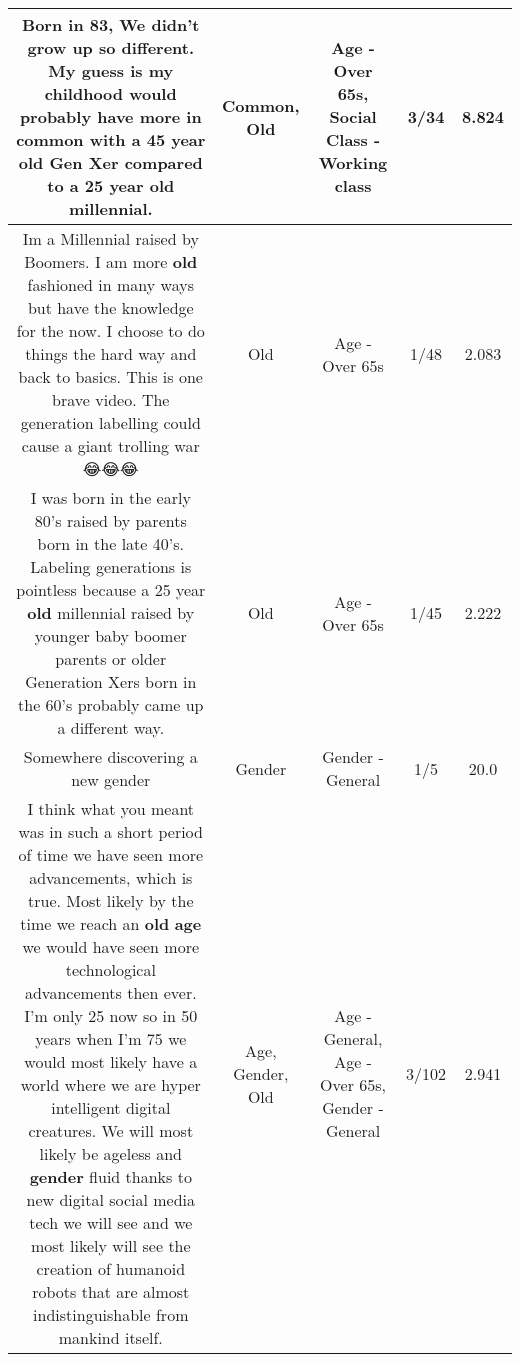 \documentclass[11pt]{article}
\newlength\mylength
\begin{document}
\begin{center}
\begin{longtable}{|C{.65\mylength}|C{.30\mylength}|C{.12\mylength}|C{.12\mylength}|C{.12\mylength}|}
  \small Born in 83, We didn't grow up so different. My guess is my childhood would probably have more in \textbf{common} with a 45 year \textbf{old} Gen Xer compared to a 25 year \textbf{old} millennial.\normalsize   & Common, Old & Age - Over 65s, Social Class - Working class & 3/34 & 8.824 \\  \hline
  \small Im a Millennial raised by Boomers. I am more \textbf{old} fashioned in many ways but have the knowledge for the now. I choose to do things the hard way and back to basics. This is one brave video. The generation labelling could cause a giant trolling war 😂😂😂\normalsize   & Old & Age - Over 65s & 1/48 & 2.083 \\  \hline
  \small I was born in the early 80's raised by parents born in the late 40's. Labeling generations is pointless because a 25 year \textbf{old} millennial raised by younger baby boomer parents or older Generation Xers born in the 60's probably came up a different way.\normalsize   & Old & Age - Over 65s & 1/45 & 2.222 \\  \hline
  \small Somewhere discovering a new gender\normalsize   & Gender & Gender - General & 1/5 & 20.0 \\  \hline
  \small I think what you meant was in such a short period of time we have seen more advancements, which is true. Most likely by the time we reach an \textbf{old} \textbf{age} we would have seen more technological advancements then ever. I'm only 25 now so in 50 years when I'm 75 we would most likely have a world where we are hyper intelligent digital creatures. We will most likely be ageless and \textbf{gender} fluid thanks to new digital social media tech we will see and we most likely will see the creation of humanoid robots that are almost indistinguishable from mankind itself.\normalsize   & Age, Gender, Old & Age - General, Age - Over 65s, Gender - General & 3/102 & 2.941 \\  \hline

\end{longtable}
\end{center}
\end{document}
